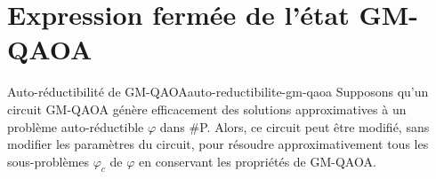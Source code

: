 \begin{comment}
\end{comment}


\chapter{Expression fermée de l'état GM-QAOA}
\label{ann:auto-reductibilite-du-circuit-gm-qaoa}


\begin{maintheorem}{Auto-réductibilité de GM-QAOA}{auto-reductibilite-gm-qaoa}
    Supposons qu'un circuit GM-QAOA génère efficacement des solutions approximatives à un problème auto-réductible $\varphi$ dans \textsf{\#P}. Alors, ce circuit peut être modifié, sans modifier les paramètres du circuit, pour résoudre approximativement tous les sous-problèmes $\varphi_{c}$ de $\varphi$ en conservant les propriétés de GM-QAOA.
\end{maintheorem}


